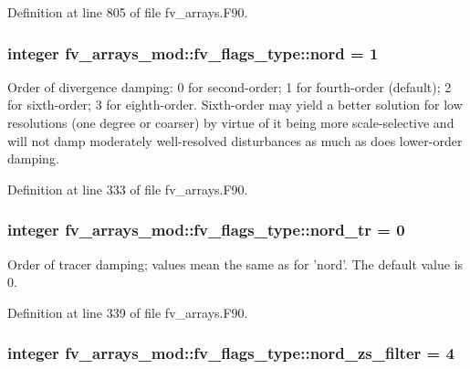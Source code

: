 Definition at line 805 of file fv\-\_\-arrays.\-F90.

\subsubsection[{nord}]{\setlength{\rightskip}{0pt plus 5cm}integer fv\-\_\-arrays\-\_\-mod\-::fv\-\_\-flags\-\_\-type\-::nord = 1}\label{structfv__arrays__mod_1_1fv__flags__type_a2a8b948ce9b26a36723b037fb1db2cba}


Order of divergence damping\-: 0 for second-\/order; 1 for fourth-\/order (default); 2 for sixth-\/order; 3 for eighth-\/order. Sixth-\/order may yield a better solution for low resolutions (one degree or coarser) by virtue of it being more scale-\/selective and will not damp moderately well-\/resolved disturbances as much as does lower-\/order damping. 



Definition at line 333 of file fv\-\_\-arrays.\-F90.

\subsubsection[{nord\-\_\-tr}]{\setlength{\rightskip}{0pt plus 5cm}integer fv\-\_\-arrays\-\_\-mod\-::fv\-\_\-flags\-\_\-type\-::nord\-\_\-tr = 0}\label{structfv__arrays__mod_1_1fv__flags__type_a78c41b066c189e7e6fa24eebc9b525f2}


Order of tracer damping; values mean the same as for 'nord'. The default value is 0. 



Definition at line 339 of file fv\-\_\-arrays.\-F90.

\subsubsection[{nord\-\_\-zs\-\_\-filter}]{\setlength{\rightskip}{0pt plus 5cm}integer fv\-\_\-arrays\-\_\-mod\-::fv\-\_\-flags\-\_\-type\-::nord\-\_\-zs\-\_\-filter = 4}\label{structfv__arrays__mod_1_1fv__flags__type_a98601ce30b19c5c1c911dc216d3fc22a}


